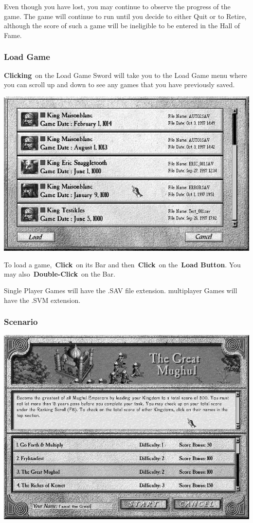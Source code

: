 Even though you have lost, you may continue to observe the progress of the game. The game will continue to run until you decide to either Quit or to Retire, although the score of such a game will be ineligible to be entered in the Hall of Fame.

\subsubsection{Load Game}

\textbf{Clicking} on the Load Game Sword will take you to the Load Game menu where you can scroll up and down to see any games that you have previously saved.

\begin{center}
	\includegraphics[width=0.7\linewidth]{Iload}
\end{center}

To load a game, \textbf{Click} on its Bar and then \textbf{Click} on the \textbf{Load Button}.
You may also \textbf{Double-Click} on the Bar.

Single Player Games will have the .SAV file extension. multiplayer Games will have the .SVM extension.

\subsubsection{Scenario}

\begin{center}
	\includegraphics[width=0.7\linewidth]{Iscenario}
\end{center}

